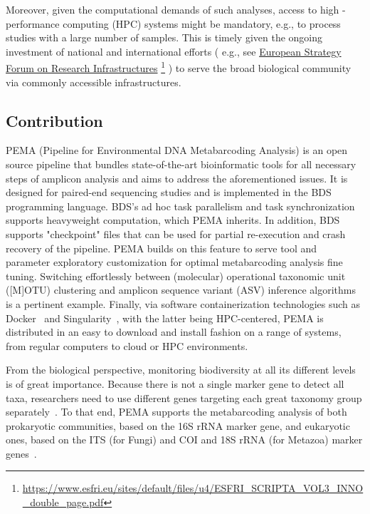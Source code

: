    Moreover, given the computational demands of such analyses, access to high - performance computing (HPC) systems might be mandatory, e.g., to process studies with a large number of samples. 
   This is timely given the ongoing investment of national and international efforts (
   e.g., see 
   \href{https://www.esfri.eu/sites/default/files/u4/ESFRI_SCRIPTA_VOL3_INNO_double_page.pdf}{European Strategy Forum on Research Infrastructures} \footnote{
      \href{https://www.esfri.eu/sites/default/files/u4/ESFRI_SCRIPTA_VOL3_INNO_double_page.pdf}{https://www.esfri.eu/sites/default/files/u4/ESFRI\_SCRIPTA\_VOL3\_INNO\_double\_page.pdf}
   }
   ) 
   to serve the broad biological community via commonly accessible infrastructures.
   
   \subsection{Contribution}

   PEMA (Pipeline for Environmental DNA Metabarcoding Analysis) is an open source pipeline that bundles state-of-the-art bioinformatic tools for all necessary steps of amplicon analysis and aims to address the aforementioned issues. 
   It is designed for paired-end sequencing studies and is implemented in the BDS~\citep{cingolani2015bigdatascript} programming language. 
   BDS's ad hoc task parallelism and task synchronization supports heavyweight computation, which PEMA inherits. 
   In addition, BDS supports "checkpoint" files that can be used for partial re-execution and crash recovery of the pipeline. 
   PEMA builds on this feature to serve tool and parameter exploratory customization for optimal metabarcoding analysis fine tuning.
   Switching effortlessly between (molecular) operational taxonomic unit ([M]OTU) clustering and amplicon sequence variant (ASV) inference algorithms is a pertinent example. 
   Finally, via software containerization technologies such as Docker~\citep{rad2017introduction} and Singularity~\citep{kurtzer2017singularity}, with the latter being HPC-centered, PEMA is distributed in an easy to download and install fashion on a range of systems, from regular computers to cloud or HPC environments.
   
   From the biological perspective, monitoring biodiversity at all its different levels is of great importance. Because there is not a single marker gene to detect all taxa, researchers need to use different genes targeting each great taxonomy group separately~\citep{coissac2012bioinformatic}. 
   To that end, PEMA supports the metabarcoding analysis of both prokaryotic communities, based on the 16S rRNA marker gene, and eukaryotic ones, based on the ITS (for Fungi) and COI and 18S rRNA (for Metazoa) marker genes~\citep{coissac2012bioinformatic}.
   
